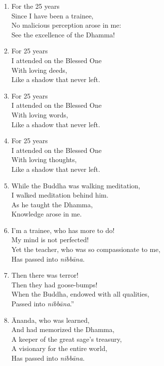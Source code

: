 \documentclass[10pt, openany]{book}
\newcommand*{\vleftofline}[1]{\leavevmode\llap{#1}}
\begin{document}
\begin{enumerate}
\item For the 25 years\\
Since I have been a trainee,\\
No malicious perception arose in me:\\
See the excellence of the Dhamma!

\item For 25 years\\
I attended on the Blessed One\\
With loving deeds,\\
Like a shadow that never left.

\item For 25 years\\
I attended on the Blessed One\\
With loving words,\\
Like a shadow that never left.

\item For 25 years\\
I attended on the Blessed One\\
With loving thoughts,\\
Like a shadow that never left.

\item While the Buddha was walking meditation,\\
I walked meditation behind him.\\
As he taught the Dhamma,\\
Knowledge arose in me.

\item I’m a trainee, who has more to do!\\
My mind is not perfected!\\
Yet the teacher, who was so compassionate to me,\\
Has passed into \emph{nibbāna}.

\item Then there was terror!\\
Then they had goose-bumps!\\
When the Buddha, endowed with all qualities,\\
Passed into \emph{nibbāna}.”

\item \vleftofline{“}Ānanda, who was learned, \\
And had memorized the Dhamma,\\
A keeper of the great sage’s treasury,\\
A visionary for the entire world,\\
Has passed into \emph{nibbāna}.


\end{enumerate}
\end{document}
